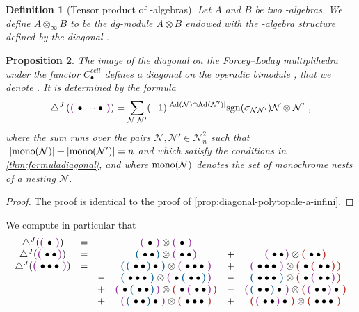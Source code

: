 \documentclass[twoside, 12pt]{amsart}
\newtheorem{definition}{Definition}[section]
\newtheorem{proposition}[definition]{Proposition}
\theoremstyle{remark}
\begin{document}
\begin{definition}[Tensor product of \Ainf -algebras] \label{def:tensor-product-ainf-alg}
Let $A$ and $B$ be two \Ainf -algebras. We define $A \otimes_\infty B$ to be the dg-module $A \otimes B$ endowed with the \Ainf -algebra structure defined by the diagonal \diagainf .
\end{definition}

\begin{proposition}
\label{prop:diagonal-polytopale-m-infini}
The image of the diagonal on the Forcey--Loday multiplihedra under the functor $C_\bullet^{cell}$ defines a diagonal on the operadic bimodule \Minf , that we denote \diagminf . It is determined by the formula
\[ \diagminf \left( \purple{\bullet \cdots \bullet} \right) = 
\sum_{
\mathcal{N},\mathcal{N}'} 
(-1)^{|\mathrm{Ad}(\mathcal{N})\cap \mathrm{Ad}(\mathcal{N}')|}
\mathrm{sgn}(\sigma_{\mathcal{N}\mathcal{N}'})
\mathcal{N} \otimes \mathcal{N}' \ ,\]
where the sum runs over the pairs $\mathcal{N},\mathcal{N}' \in \mathcal{N}^2_n$ such that $\ |\mono(\mathcal{N})|+|\mono(\mathcal{N}')|=n$ and which satisfy the conditions in \cref{thm:formuladiagonal}, and where $\mathrm{mono}(\mathcal{N})$ denotes the set of monochrome nests of a nesting $\mathcal{N}$. 
\end{proposition}

\begin{proof}
The proof is identical to the proof of \cref{prop:diagonal-polytopale-a-infini}. 
\end{proof}

We compute in particular that 
\[
\begin{matrix}
\diagminf ( \purple{ \bullet } )  
&=&  & \purple{ \bullet } \otimes \purple{ \bullet } & &  \\
\diagminf ( \purple{ \bullet \bullet } ) 
&=& & \blue{\bullet \bullet} \otimes \purple{\bullet \bullet} & + & \purple{\bullet \bullet} \otimes \red{\bullet \bullet} \\
\diagminf (\purple{\bullet \bullet \bullet}) 
&=& 
& \blue{\blue{\bullet \bullet}\bullet} \otimes \purple{\bullet \bullet \bullet} 
& + & \purple{\bullet \bullet \bullet} \otimes \red{\bullet \red{\bullet \bullet}} \\
& &- &  \blue{\bullet \bullet \bullet} \otimes \purple{\bullet \blue{\bullet \bullet}}    &  - & \blue{\bullet \bullet \bullet} \otimes \red{\bullet \purple{\bullet \bullet}}  \\  &   &+ & \purple{\bullet \blue{\bullet \bullet}} \otimes \red{\bullet \purple{\bullet \bullet}} 
  &  - & \purple{\blue{\bullet \bullet} \bullet} \otimes \red{\purple{\bullet \bullet} \bullet} \\ & &  + & \purple{\blue{\bullet \bullet} \bullet} \otimes \red{\bullet \bullet \bullet}   &  + & \red{\purple{\bullet \bullet} \bullet} \otimes \red{\bullet \bullet \bullet} 
  \end{matrix}
\]
\end{document}
